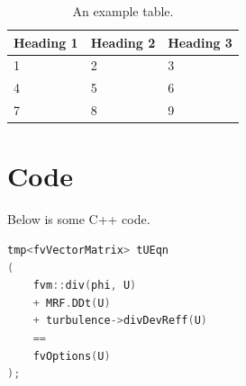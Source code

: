 \documentclass{article}
\begin{document}
	\begin{table}[h!]
		\caption{An example table.}
		\label{tabletest}
		\begin{center}
  			\begin{tabularx}{\textwidth}{ X X X }
    				\toprule
    				Heading 1 & Heading 2 & Heading 3 \\ 
    				\midrule
    				1 & 2 & 3 \\ 
    				4 & 5 & 6 \\ 
    				7 & 8 & 9 \\
    				\bottomrule
  			\end{tabularx}
		\end{center}
	\end{table}

	\section{Code}
	Below is some C++ code.
	\begin{lstlisting}[language=C++]
tmp<fvVectorMatrix> tUEqn
(
	fvm::div(phi, U)
	+ MRF.DDt(U)
	+ turbulence->divDevReff(U)
	==
	fvOptions(U)
);
\end{lstlisting}
   
	
	
	\label{bibsect}
\end{document}
